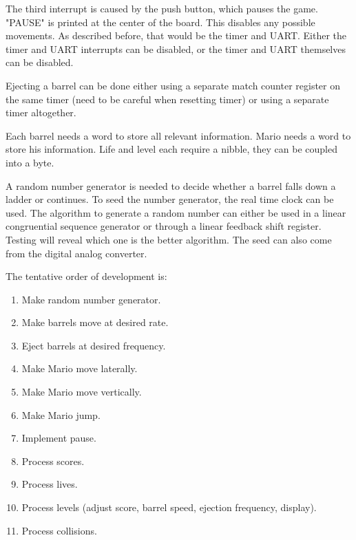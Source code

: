 \documentclass[letterpaper,10pt]{article}
\begin{document}
    The third interrupt is caused by the push button, which pauses the game.
    "PAUSE" is printed at the center of the board. This disables any possible
    movements. As described before, that would be the timer and UART. Either
    the timer and UART interrupts can be disabled, or the timer and UART themselves
    can be disabled.

    Ejecting a barrel can be done either using a separate match counter register
    on the same timer (need to be careful when resetting timer) or using a separate
    timer altogether.

    Each barrel needs a word to store all relevant information. Mario needs a
    word to store his information. Life and level each require a nibble, they
    can be coupled into a byte.

    A random number generator is needed to decide whether a barrel falls down a
    ladder or continues. To seed the number generator, the real time clock can
    be used. The algorithm to generate a random number can either be used in a
    linear congruential sequence generator or through a linear feedback shift
    register. Testing will reveal which one is the better algorithm. The seed
    can also come from the digital analog converter.

    The tentative order of development is:

    \begin{enumerate}
        \item Make random number generator.
        \item Make barrels move at desired rate.
        \item Eject barrels at desired frequency.
        \item Make Mario move laterally.
        \item Make Mario move vertically.
        \item Make Mario jump.
        \item Implement pause.
        \item Process scores.
        \item Process lives.
        \item Process levels (adjust score, barrel speed, ejection frequency, display).
        \item Process collisions.
    \end{enumerate}
\end{document}
